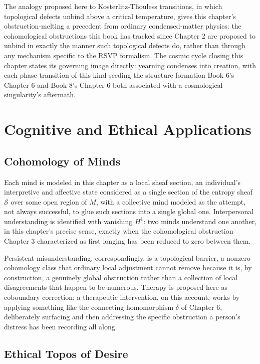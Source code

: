 The analogy proposed here to Kosterlitz-Thouless transitions, in which topological defects unbind above a critical temperature, gives this chapter's obstruction-melting a precedent from ordinary condensed-matter physics: the cohomological obstructions this book has tracked since Chapter 2 are proposed to unbind in exactly the manner such topological defects do, rather than through any mechanism specific to the RSVP formalism. The cosmic cycle closing this chapter states its governing image directly: yearning condenses into creation, with each phase transition of this kind seeding the structure formation Book 6's Chapter 6 and Book 8's Chapter 6 both associated with a cosmological singularity's aftermath.

\part{Cognitive and Ethical Applications}

\chapter{Cohomology of Minds}

Each mind is modeled in this chapter as a local sheaf section, an individual's interpretive and affective state considered as a single section of the entropy sheaf $\mathcal{S}$ over some open region of $M$, with a collective mind modeled as the attempt, not always successful, to glue such sections into a single global one. Interpersonal understanding is identified with vanishing $H^1$: two minds understand one another, in this chapter's precise sense, exactly when the cohomological obstruction Chapter 3 characterized as first longing has been reduced to zero between them.

Persistent misunderstanding, correspondingly, is a topological barrier, a nonzero cohomology class that ordinary local adjustment cannot remove because it is, by construction, a genuinely global obstruction rather than a collection of local disagreements that happen to be numerous. Therapy is proposed here as coboundary correction: a therapeutic intervention, on this account, works by applying something like the connecting homomorphism $\delta$ of Chapter 6, deliberately surfacing and then addressing the specific obstruction a person's distress has been recording all along.

\chapter{Ethical Topos of Desire}

